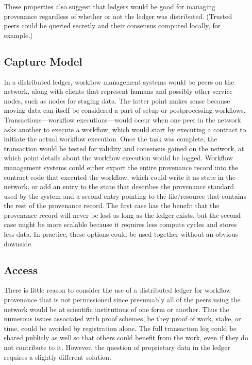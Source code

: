 These properties also suggest that ledgers would be good for managing provenance regardless of whether or not the ledger was distributed. (Trusted peers could be queried secretly and their consensus computed locally, for example.)

\subsection{Capture Model}
In a distributed ledger, workflow management systems would be peers on the network, along with clients that represent humans and possibly other service nodes, such as nodes for staging data. The latter point makes sense because moving data can itself be considered a part of setup or postprocessing workflows. Transactions---workflow executions---would occur when one peer in the network asks another to execute a workflow, which would start by executing a contract to initiate the actual workflow execution. Once the task was complete, the transaction would be tested for validity and consensus gained on the network, at which point details about the workflow execution would be logged. Workflow management systems could either export the entire provenance record into the contract code that executed the workflow, which could write it as state in the network, or add an entry to the state that describes the provenance standard used by the system and a second entry pointing to the file/resource that contains the rest of the provenance record. The first case has the benefit that the provenance record will never be lost as long as the ledger exists, but the second case might be more scalable because it requires less compute cycles and stores less data. In practice, these options could be used together without an obvious downside.

\subsection{Access}
There is little reason to consider the use of a distributed ledger for workflow provenance that is not permissioned since presumably all of the peers using the network would be at scientific institutions of one form or another. Thus the numerous issues associated with proof schemes, be they proof of work, stake, or time, could be avoided by registration alone. The full transaction log could be shared publicly as well so that others could benefit from the work, even if they do not contribute to it. However, the question of proprietary data in the ledger requires a slightly different solution.

